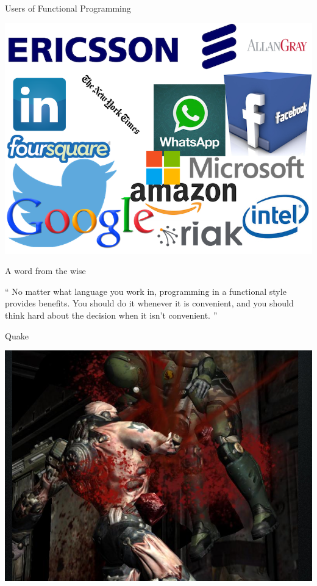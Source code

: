 \documentclass{beamer}
\begin{document}
\begin{frame}{Users of Functional Programming}
  \begin{center}
    \includegraphics[scale=0.3]{img/cufp.png}
  \end{center}
\end{frame}

\begin{frame}{A word from the wise}
  \begin{exampleblock}{}
    {\Large ``
      No matter what language you work in, programming
      in a functional style provides benefits.
      You should do it whenever it is convenient, and you
      should think hard about the decision when it isn’t convenient.
      ''}
    \vskip5mm
    \hspace*{}
  \end{exampleblock}
\end{frame}

\begin{frame}{Quake}
  \begin{center}
    \includegraphics[scale=0.4]{img/quake.png}
  \end{center}
\end{frame}
\end{document}
